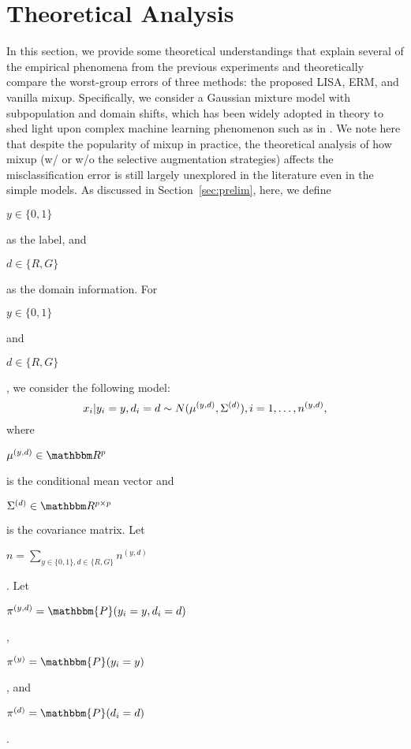 \section{Theoretical Analysis}
\label{sec:theory}
In this section, we provide some theoretical understandings that explain several of the empirical phenomena from the previous experiments and theoretically compare the worst-group errors of three methods: the proposed LISA, ERM, and vanilla mixup. Specifically, we consider a Gaussian mixture model with subpopulation and domain shifts, which has been widely adopted in theory to shed light upon complex machine learning phenomenon such as in \cite{montanari2019generalization,zhang2021and, liu2021self}. We   note here that despite the popularity of mixup in practice, the theoretical analysis of how mixup (w/ or w/o the selective augmentation strategies) affects the misclassification error is still largely unexplored in the literature even in the simple models. As discussed in Section~\ref{sec:prelim}, here, we define \begin{small}$y\in\{0,1\}$\end{small} as the label, and \begin{small}$d\in\{R,G\}$\end{small} as the domain information. For \begin{small}$y\in\{0,1\}$\end{small} and \begin{small}$d\in\{R,G\}$\end{small}, we consider the following model:
\begin{equation}
\small
\label{m1}
    x_i|y_i=y,d_i=d\sim N(\mu^{(y,d)},\Sigma^{(d)}), i=1,\dots,n^{(y,d)},
\end{equation}
where \begin{small}$\mu^{(y,d)}\in\R^p$\end{small} is the conditional mean vector and \begin{small}$\Sigma^{(d)}\in\R^{p\times p}$\end{small} is the covariance matrix. Let \begin{small}$n=\sum_{y\in\{0,1\},d\in\{R,G\}}n^{(y,d)}$\end{small}. 
Let \begin{small}$\pi^{(y,d)}=\mathbbm{P}(y_i=y,d_i=d)$\end{small}, \begin{small}$\pi^{(y)}=\mathbbm{P}(y_i=y)$\end{small}, and \begin{small}$\pi^{(d)}=\mathbbm{P}(d_i=d)$\end{small}.


